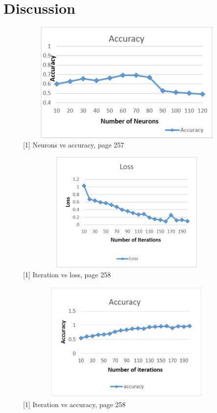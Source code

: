 \documentclass[12pt, letterpaper]{article}
\begin{document}
\section{Discussion} 
\begin{figure}[H]
    \includegraphics[width=12cm,height=6cm]{images/discuss_1.png}
    \caption{[1] Neurons vs accuracy, page 257}
    \label{fig:L1}
\end{figure} 
\begin{figure}[H]
    \includegraphics[width=12cm,height=6cm]{images/discuss_2.png}
    \caption{[1] Iteration vs loss, page 258}
    \label{fig:L1}
\end{figure} 
\begin{figure}[H]
    \includegraphics[width=12cm,height=6cm]{images/discuss_3.png}
    \caption{[1] Iteration vs accuracy, page 258}
    \label{fig:L1}
\end{figure} 
\end{document}
